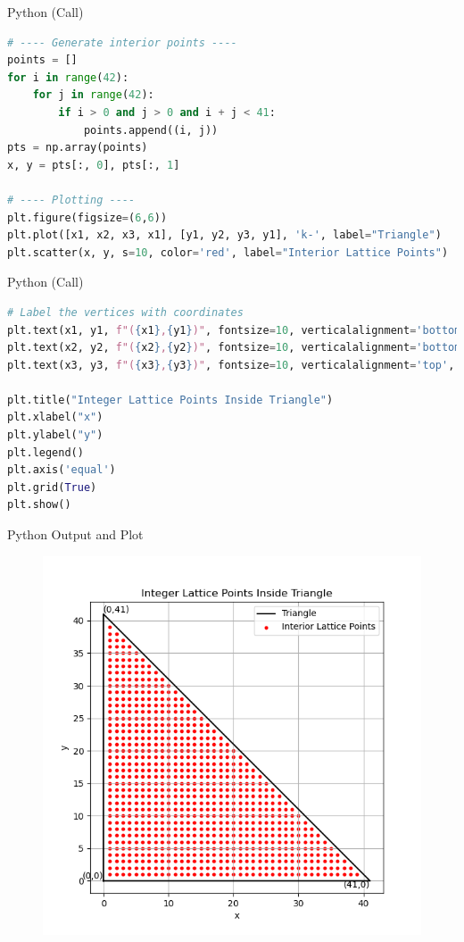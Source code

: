 \documentclass{beamer}
\begin{document}
\begin{frame}[fragile]{Python (Call)}
\begin{lstlisting}[language=Python]
# ---- Generate interior points ----
points = []
for i in range(42):
    for j in range(42):
        if i > 0 and j > 0 and i + j < 41:
            points.append((i, j))
pts = np.array(points)
x, y = pts[:, 0], pts[:, 1]

# ---- Plotting ----
plt.figure(figsize=(6,6))
plt.plot([x1, x2, x3, x1], [y1, y2, y3, y1], 'k-', label="Triangle")
plt.scatter(x, y, s=10, color='red', label="Interior Lattice Points")
\end{lstlisting}
\end{frame}

\begin{frame}[fragile]{Python (Call)}
\begin{lstlisting}[language=Python]
# Label the vertices with coordinates
plt.text(x1, y1, f"({x1},{y1})", fontsize=10, verticalalignment='bottom', horizontalalignment='right')
plt.text(x2, y2, f"({x2},{y2})", fontsize=10, verticalalignment='bottom', horizontalalignment='left')
plt.text(x3, y3, f"({x3},{y3})", fontsize=10, verticalalignment='top', horizontalalignment='right')

plt.title("Integer Lattice Points Inside Triangle")
plt.xlabel("x")
plt.ylabel("y")
plt.legend()
plt.axis('equal')
plt.grid(True)
plt.show()
\end{lstlisting}
\end{frame}
\begin{frame}{Python Output and Plot}
\begin{figure}[h!]
\includegraphics[width=0.70\columnwidth]{figs/9.png}
\caption{}
\end{figure}
\end{frame}
\end{document}
